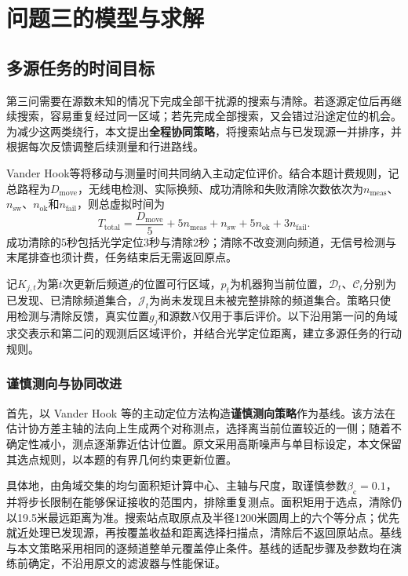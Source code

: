 \section{问题三的模型与求解}
\label{sec:q3}

\subsection{多源任务的时间目标}

第三问需要在源数未知的情况下完成全部干扰源的搜索与清除。若逐源定位后再继续搜索，容易重复经过同一区域；若先完成全部搜索，又会错过沿途定位的机会。为减少这两类绕行，本文提出\textbf{全程协同策略}，将搜索站点与已发现源一并排序，并根据每次反馈调整后续测量和行进路线。

Vander Hook等将移动与测量时间共同纳入主动定位评价\cite{VanderHook2014}。结合本题计费规则，记总路程为$D_{\mathrm{move}}$，无线电检测、实际换频、成功清除和失败清除次数依次为$n_{\mathrm{meas}}$、$n_{\mathrm{sw}}$、$n_{\mathrm{ok}}$和$n_{\mathrm{fail}}$，则总虚拟时间为
\begin{equation}
T_{\mathrm{total}}=\frac{D_{\mathrm{move}}}{5}+5n_{\mathrm{meas}}+n_{\mathrm{sw}}
                     +5n_{\mathrm{ok}}+3n_{\mathrm{fail}}.
\label{eq:q3-cost}
\end{equation}
成功清除的5秒包括光学定位3秒与清除2秒；清除不改变测向频道，无信号检测与末尾排查也须计费，任务结束后无需返回原点。

记$K_{j,t}$为第$t$次更新后频道$j$的位置可行区域，$p_t$为机器狗当前位置，$\mathcal D_t$、$\mathcal C_t$分别为已发现、已清除频道集合，$\mathcal J_t$为尚未发现且未被完整排除的频道集合。策略只使用检测与清除反馈，真实位置$g_j$和源数$N$仅用于事后评价。以下沿用第一问的角域求交表示和第二问的观测后区域评价，并结合光学定位距离，建立多源任务的行动规则。


\subsubsection{谨慎测向与协同改进}

首先，以 Vander Hook 等的主动定位方法\cite{VanderHook2014}构造\textbf{谨慎测向策略}作为基线。该方法在估计协方差主轴的法向上生成两个对称测点，选择离当前位置较近的一侧；随着不确定性减小，测点逐渐靠近估计位置。原文采用高斯噪声与单目标设定，本文保留其选点规则，以本题的有界几何约束更新位置。

具体地，由角域交集的均匀面积矩计算中心、主轴与尺度，取谨慎参数$\beta_{\mathrm c}=0.1$，并将步长限制在能够保证接收的范围内，排除重复测点。面积矩用于选点，清除仍以19.5米最远距离为准。搜索站点取原点及半径1200米圆周上的六个等分点；优先就近处理已发现源，再按覆盖收益和距离选择扫描点，清除后不返回原站点。基线与本文策略采用相同的逐频道整单元覆盖停止条件。基线的适配步骤及参数均在演练前确定，不沿用原文的滤波器与性能保证。

